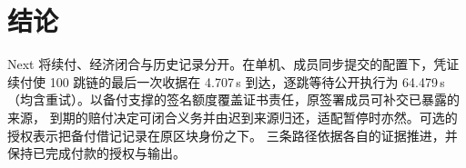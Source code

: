 \section{结论}
\label{sec:conclusion}

Next 将续付、经济闭合与历史记录分开。在单机、成员同步提交的配置下，凭证续付使 100 跳链的最后一次收据在
4.707\,s 到达，逐跳等待公开执行为 64.479\,s（均含重试）。以备付支撑的签名额度覆盖证书责任，原签署成员可补交已暴露的来源，
到期的赔付决定可闭合义务并由迟到来源归还，适配暂停时亦然。可选的授权表示把备付借记记录在原区块身份之下。
三条路径依据各自的证据推进，并保持已完成付款的授权与输出。
